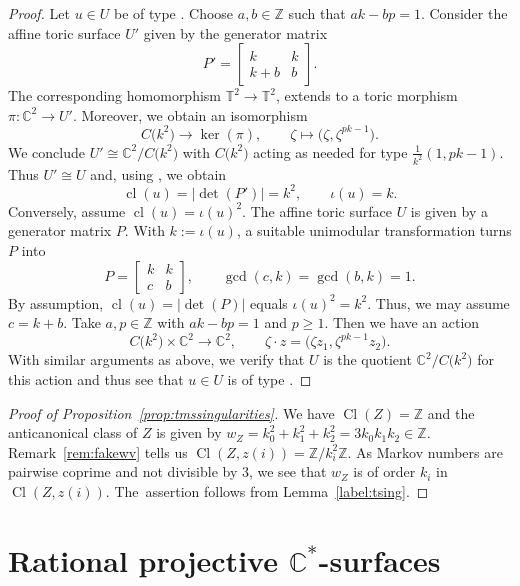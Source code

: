 \documentclass[pdftex]{sigma}
\theoremstyle{definition}
\def\CC{{\mathbb C}}
\def\TT{{\mathbb T}}
\def\ZZ{{\mathbb Z}}
\DeclareMathOperator{\Cl}{Cl}
\DeclareMathOperator{\cl}{cl}
\begin{document}
\begin{proof}
Let $u \in U$ be of type .
Choose $a,b \in \ZZ$ such that $ak - bp = 1$.
Consider the affine toric surface $U'$ given by the
generator matrix
\[
P'
 =
\begin{bmatrix}
k & k
\\
k + b & b
\end{bmatrix}.
\]
The corresponding homomorphism $\TT^2 \to \TT^2$,
extends to a toric morphism $\pi \colon \CC^2 \to U'$.
Moreover, we obtain an isomorphism
\[
C\bigl(k^2\bigr) \to \ker(\pi),
\qquad
\zeta \mapsto \bigl(\zeta, \zeta^{pk-1}\bigr).
\]
We conclude $U' \cong \CC^2/C\bigl(k^2\bigr)$ with $C\bigl(k^2\bigr)$ acting
as needed for type $\frac{1}{k^2}(1,pk-1)$.
Thus $U' \cong U$ and, using \cite[Remark~3.7]{HaHaSp},
we obtain
\[
\cl(u) = \vert {\det}(P') \vert = k^2,
\qquad
\iota(u) = k.
\]
Conversely, assume $\cl(u) = \iota(u)^2$.
The affine toric surface $U$
is given by a generator matrix $P$.
With $k := \iota(u)$, a suitable unimodular transformation
turns $P$ into
\[
P
 =
\begin{bmatrix}
k & k
\\
c & b
\end{bmatrix},
\qquad
\gcd(c,k) = \gcd(b,k)=1.
\]
By assumption, $\cl(u) = \vert {\det}(P) \vert$
equals $\iota(u)^2 = k^2$.
Thus, we may assume $c = k+b$.
Take $a,p \in \ZZ$ with
$ak - bp = 1$ and $p \ge 1$.
Then we have an action
\[
C\bigl(k^2\bigr) \times \CC^2 \to \CC^2,
\qquad
\zeta \cdot z = \bigl(\zeta z_1, \zeta^{pk-1} z_2\bigr).
\]
With similar arguments as above, we verify that
$U$ is the quotient $\CC^2/C\bigl(k^2\bigr)$ for this action
and thus see that $u \in U$ is of type
.
\end{proof}

\begin{proof}[Proof of Proposition~\ref{prop:tmssingularities}]
We have $\Cl(Z) = \ZZ$ and the anticanonical class of $Z$ is
given by $w_Z = k_0^2+k_1^2+k_2^2 = 3k_0k_1k_2 \in \ZZ$.
Remark~\ref{rem:fakewv} tells us $\Cl(Z,z(i)) = \ZZ / k_i^2\ZZ$.
As Markov numbers are pairwise coprime and not divisible by 3,
we see that $w_Z$ is of order $k_i$ in $\Cl(Z,z(i))$.
The~assertion follows from Lemma~\ref{label:tsing}.
\end{proof}

\section[Rational projective C*-surfaces]{Rational projective $\boldsymbol{\CC^*}$-surfaces}
\end{document}

